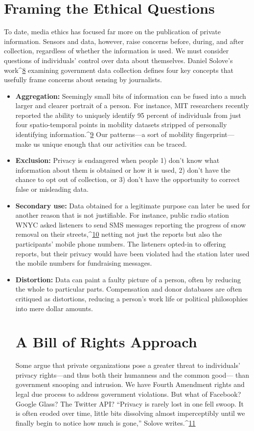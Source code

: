 \section{Framing the Ethical Questions}
To date, media ethics has focused far more on the publication of private
information. Sensors and data, however, raise concerns before, during, and
after collection, regardless of whether the information is used. We must
consider questions of individuals' control over data about themselves. Daniel
Solove's work^{\href{#endnotes-culver}{8}} examining government data collection defines four key
concepts that usefully frame concerns about sensing by journalists.
\begin{itemize}
\item \textbf{Aggregation:} Seemingly small bits of information can be fused into a
much larger and clearer portrait of a person. For instance, MIT researchers
recently reported the ability to uniquely identify 95 percent of individuals
from just four spatio-temporal points in mobility datasets stripped of personally
identifying information.^{\href{#endnotes-culver}{9}} Our patterns—a sort of mobility fingerprint—
make us unique enough that our activities can be traced.

\item \textbf{Exclusion:} Privacy is endangered when people 1) don't know what information
about them is obtained or how it is used, 2) don't have the chance
to opt out of collection, or 3) don't have the opportunity to correct false or
misleading data.

\item \textbf{Secondary use:} Data obtained for a legitimate purpose can later be used
for another reason that is not justifiable. For instance, public radio station
WNYC asked listeners to send SMS messages reporting the progress of
snow removal on their streets,^{\href{#endnotes-culver}{10}} netting not just the reports but also the participants'
mobile phone numbers. The listeners opted-in to offering reports,
but their privacy would have been violated had the station later used the
mobile numbers for fundraising messages.

\item \textbf{Distortion:} Data can paint a faulty picture of a person, often by reducing
the whole to particular parts. Compensation and donor databases are often
critiqued as distortions, reducing a person's work life or political philosophies
into mere dollar amounts.

\section{A Bill of Rights Approach}
Some argue that private organizations pose a greater threat to individuals'
privacy rights—and thus both their humanness and the common good—
than government snooping and intrusion. We have Fourth Amendment
rights and legal due process to address government violations. But what of
Facebook? Google Glass? The Twitter API?
``Privacy is rarely lost in one fell swoop. It is often eroded over time, little
bits dissolving almost imperceptibly until we finally begin to notice how
much is gone,'' Solove writes.^{\href{#endnotes-culver}{11}}


\end{itemize}
